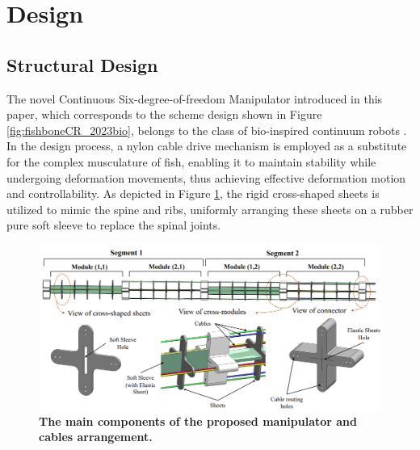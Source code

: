 \section{Design} 
\subsection{Structural Design}
The novel Continuous Six-degree-of-freedom Manipulator introduced in this paper, which corresponds to the scheme design 
shown in Figure \ref{fig:fishboneCR_2023bio}, belongs to the class of bio-inspired continuum robots \cite{fishboneCR}. 
In the design process, a nylon cable drive mechanism is employed as a substitute for the complex musculature of fish, 
enabling it to maintain stability while undergoing deformation movements, thus achieving effective deformation motion 
and controllability. As depicted in Figure \ref{fig:main_components}, the rigid cross-shaped sheets is utilized to mimic 
the spine and ribs, uniformly arranging these sheets on a rubber pure soft sleeve to replace the spinal joints.
\begin{figure}[H] %
    \centering
    \captionsetup{labelsep=colon}
    \includegraphics[width=1.0\textwidth]{Image/Design/main_component_of_manipulator.png} 
    \caption[The main components of the proposed manipulator and cables arrangement]
    {\centering \textbf{The main components of the proposed manipulator and cables arrangement.}}
    \label{fig:main_components}
\end{figure}
